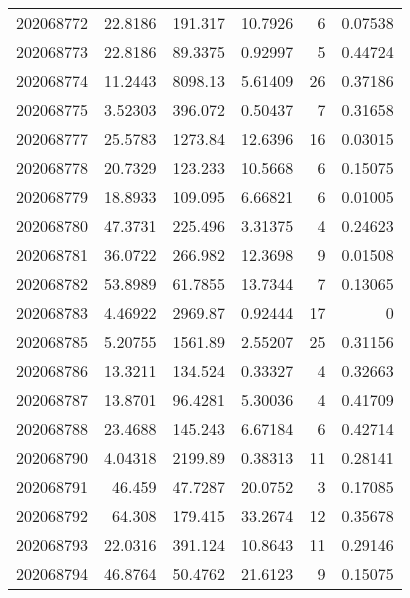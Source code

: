 \begin{tabular}{rrrrrr}
 202068772 &         22.8186  &      191.317  &           10.7926  &           6 & 0.07538 \\
 202068773 &         22.8186  &       89.3375 &            0.92997 &           5 & 0.44724 \\
 202068774 &         11.2443  &     8098.13   &            5.61409 &          26 & 0.37186 \\
 202068775 &          3.52303 &      396.072  &            0.50437 &           7 & 0.31658 \\
 202068777 &         25.5783  &     1273.84   &           12.6396  &          16 & 0.03015 \\
 202068778 &         20.7329  &      123.233  &           10.5668  &           6 & 0.15075 \\
 202068779 &         18.8933  &      109.095  &            6.66821 &           6 & 0.01005 \\
 202068780 &         47.3731  &      225.496  &            3.31375 &           4 & 0.24623 \\
 202068781 &         36.0722  &      266.982  &           12.3698  &           9 & 0.01508 \\
 202068782 &         53.8989  &       61.7855 &           13.7344  &           7 & 0.13065 \\
 202068783 &          4.46922 &     2969.87   &            0.92444 &          17 & 0       \\
 202068785 &          5.20755 &     1561.89   &            2.55207 &          25 & 0.31156 \\
 202068786 &         13.3211  &      134.524  &            0.33327 &           4 & 0.32663 \\
 202068787 &         13.8701  &       96.4281 &            5.30036 &           4 & 0.41709 \\
 202068788 &         23.4688  &      145.243  &            6.67184 &           6 & 0.42714 \\
 202068790 &          4.04318 &     2199.89   &            0.38313 &          11 & 0.28141 \\
 202068791 &         46.459   &       47.7287 &           20.0752  &           3 & 0.17085 \\
 202068792 &         64.308   &      179.415  &           33.2674  &          12 & 0.35678 \\
 202068793 &         22.0316  &      391.124  &           10.8643  &          11 & 0.29146 \\
 202068794 &         46.8764  &       50.4762 &           21.6123  &           9 & 0.15075 \\

\end{tabular}
